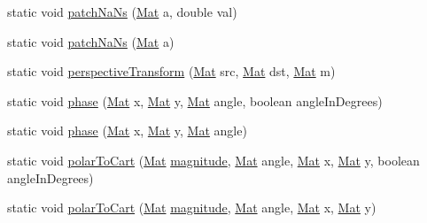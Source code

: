\begin{DoxyCompactItemize}
static void \mbox{\hyperlink{classorg_1_1opencv_1_1core_1_1_core_ab0dae7a8f13b75f48d05b12fc327009a}{patch\+Na\+Ns}} (\mbox{\hyperlink{classorg_1_1opencv_1_1core_1_1_mat}{Mat}} a, double val)
\item 
static void \mbox{\hyperlink{classorg_1_1opencv_1_1core_1_1_core_a044bc13c2a268300ece0f51213b37cfe}{patch\+Na\+Ns}} (\mbox{\hyperlink{classorg_1_1opencv_1_1core_1_1_mat}{Mat}} a)
\item 
static void \mbox{\hyperlink{classorg_1_1opencv_1_1core_1_1_core_a1ff0eace0f00e79af5228fdae120342a}{perspective\+Transform}} (\mbox{\hyperlink{classorg_1_1opencv_1_1core_1_1_mat}{Mat}} src, \mbox{\hyperlink{classorg_1_1opencv_1_1core_1_1_mat}{Mat}} dst, \mbox{\hyperlink{classorg_1_1opencv_1_1core_1_1_mat}{Mat}} m)
\item 
static void \mbox{\hyperlink{classorg_1_1opencv_1_1core_1_1_core_a09f94d89796effb89e2bff15c54b383a}{phase}} (\mbox{\hyperlink{classorg_1_1opencv_1_1core_1_1_mat}{Mat}} x, \mbox{\hyperlink{classorg_1_1opencv_1_1core_1_1_mat}{Mat}} y, \mbox{\hyperlink{classorg_1_1opencv_1_1core_1_1_mat}{Mat}} angle, boolean angle\+In\+Degrees)
\item 
static void \mbox{\hyperlink{classorg_1_1opencv_1_1core_1_1_core_aac26449052db09ffe451743fffc92270}{phase}} (\mbox{\hyperlink{classorg_1_1opencv_1_1core_1_1_mat}{Mat}} x, \mbox{\hyperlink{classorg_1_1opencv_1_1core_1_1_mat}{Mat}} y, \mbox{\hyperlink{classorg_1_1opencv_1_1core_1_1_mat}{Mat}} angle)
\item 
static void \mbox{\hyperlink{classorg_1_1opencv_1_1core_1_1_core_a90c17a6d7e194cd8baf45819267a4539}{polar\+To\+Cart}} (\mbox{\hyperlink{classorg_1_1opencv_1_1core_1_1_mat}{Mat}} \mbox{\hyperlink{classorg_1_1opencv_1_1core_1_1_core_ac0195922fb03d6bad195054e615cb4e1}{magnitude}}, \mbox{\hyperlink{classorg_1_1opencv_1_1core_1_1_mat}{Mat}} angle, \mbox{\hyperlink{classorg_1_1opencv_1_1core_1_1_mat}{Mat}} x, \mbox{\hyperlink{classorg_1_1opencv_1_1core_1_1_mat}{Mat}} y, boolean angle\+In\+Degrees)
\item 
static void \mbox{\hyperlink{classorg_1_1opencv_1_1core_1_1_core_aa5d94ecf80128fd344c06cd4d286cfd6}{polar\+To\+Cart}} (\mbox{\hyperlink{classorg_1_1opencv_1_1core_1_1_mat}{Mat}} \mbox{\hyperlink{classorg_1_1opencv_1_1core_1_1_core_ac0195922fb03d6bad195054e615cb4e1}{magnitude}}, \mbox{\hyperlink{classorg_1_1opencv_1_1core_1_1_mat}{Mat}} angle, \mbox{\hyperlink{classorg_1_1opencv_1_1core_1_1_mat}{Mat}} x, \mbox{\hyperlink{classorg_1_1opencv_1_1core_1_1_mat}{Mat}} y)
\item 

\end{DoxyCompactItemize}
